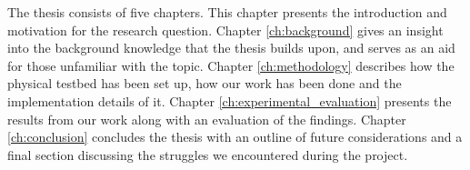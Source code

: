 The thesis consists of five chapters. This chapter presents the introduction and motivation for the research question. Chapter \ref{ch:background} gives an insight into the background knowledge that the thesis builds upon, and serves as an aid for those unfamiliar with the topic. Chapter \ref{ch:methodology} describes how the physical testbed has been set up, how our work has been done and the implementation details of it. Chapter \ref{ch:experimental_evaluation} presents the results from our work along with an evaluation of the findings. Chapter \ref{ch:conclusion} concludes the thesis with an outline of future considerations and a final section discussing the struggles we encountered during the project.